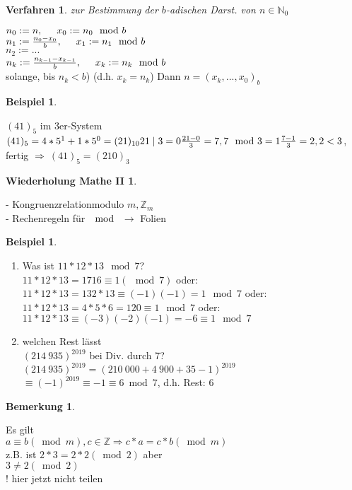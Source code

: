 \documentclass[a4paper,11pt]{article}
\newtheorem{bsp}[definition]{Beispiel}
\newtheorem{bem}[definition]{Bemerkung}
\newtheorem{wdh}[definition]{Wiederholung Mathe II}
\newtheorem{ver}[definition]{Verfahren}
\newcommand{\hsp}{\hspace{5mm}}
\begin{document}
\begin{ver}
	zur Bestimmung der $b$-adischen Darst. von $n\in\mathbb{N}_0$
\end{ver}
$n_0:=n,\hsp x_0:=n_0\mod b$ \\
$n_1:=\frac{n_0-x_0}{b},\hsp x_1:=n_1\mod b$ \\
$n_2:=...$ \\
$n_k:=\frac{n_{k-1}-x_{k-1}}{b},\hsp x_k:=n_k\mod b$ \\
solange, bis $n_k<b$) \hsp (d.h. $x_k=n_k$) Dann $n=(x_k,...,x_0)_b$ 

\begin{bsp}
\end{bsp}
$(41)_5$ im 3er-System \\
$(41)_5=4*5^1+1*5^0=(21)_{10} \\
21\mid 3=0 \\
\frac{21-0}{3}=7, 7\mod3=1 \\
\frac{7-1}{3}=2, 2<3$, fertig $\Rightarrow\:(41)_5=(210)_3$

\begin{wdh}
\end{wdh}
- Kongruenzrelationmodulo $m,\mathbb{Z}_m$ \\
- Rechenregeln für $\mod$ $\rightarrow$ Folien

\begin{bsp}
\end{bsp}
\begin{enumerate}[label=\alph*)]
	\item Was ist $11*12*13\mod 7$? \\
	$11*12*13=1716\equiv1(\mod7)$ oder: \\
	$11*12*13=132*13\equiv(-1)(-1)=1\mod7$ oder: \\
	$11*12*13=4*5*6=120\equiv1\mod7$ oder: \\
	$11*12*13\equiv(-3)(-2)(-1)=-6\equiv1\mod7$
	\item welchen Rest lässt \\
	$(214\:935)^{2019}$ bei Div. durch 7? \\
	$(214\:935)^{2019}=(210\:000+4\:900+35-1)^{2019}$ \\
	$\equiv(-1)^{2019}\equiv-1\equiv6\bmod7$, d.h. Rest: 6
\end{enumerate}

\begin{bem}
\end{bem}
Es gilt \\
$a\equiv b(\bmod m), c\in\mathbb{Z}\Rightarrow c*a=c*b(\bmod m)$ \\
z.B. ist $2*3=2*2(\bmod 2)$ aber \\
$3\neq2(\bmod2)$ \\
! hier jetzt nicht teilen
\end{document}
